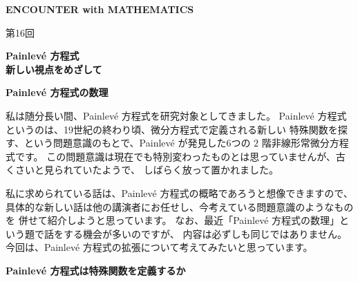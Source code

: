 \documentclass[uplatex,dvipdfmx]{jlreq}
\begin{document}
\begin{center}
  \vspace*{20pt}
  {\Huge\bfseries ENCOUNTER with MATHEMATICS}

  \vspace{10pt}
  {\huge 第16回}

  \vspace{10pt}
  {\Huge\bfseries Painlevé 方程式\\
  新しい視点をめざして}
\end{center}
\newpage

\begin{center}
  {\large\bfseries Painlevé 方程式の数理}
\end{center}

\bigskip
\hspace*{\fill}{\large\bfseries 岡本　和夫（東大・数理）}

\bigskip

私は随分長い間、Painlevé 方程式を研究対象としてきました。
Painlevé 方程式というのは、19世紀の終わり頃、微分方程式で定義される新しい
特殊関数を探す、という問題意識のもとで、Painlevé が発見した6つの
$2$ 階非線形常微分方程式です。
この問題意識は現在でも特別変わったものとは思っていませんが、古くさいと見られていたようで、
しばらく放って置かれました。

私に求められている話は、Painlevé 方程式の概略であろうと想像できますので、
具体的な新しい話は他の講演者にお任せし、今考えている問題意識のようなものを
併せて紹介しようと思っています。
なお、最近「Painlevé 方程式の数理」という題で話をする機会が多いのですが、
内容は必ずしも同じではありません。
今回は、Painlevé 方程式の拡張について考えてみたいと思っています。

\newpage

\begin{center}
  {\large\bfseries Painlevé 方程式は特殊関数を定義するか}
\end{center}

\bigskip
\hspace*{\fill}{\large\bfseries 梅村　浩（名大・多元数理）}
\end{document}
